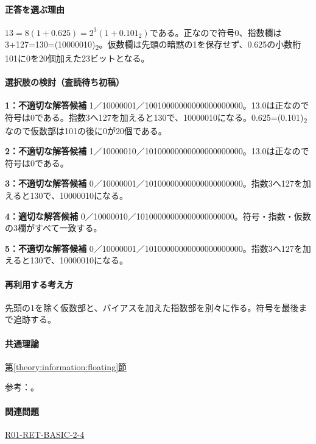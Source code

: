 \paragraph{正答を選ぶ理由} \(13=8(1+0.625)=2^3(1+0.101_2)\)である。正なので符号0、指数欄は3+127=\allowbreak{}130=\allowbreak{}(10000010)\textsubscript{2}。仮数欄は先頭の暗黙の1を保存せず、0.625の小数桁101に0を20個加えた23ビットとなる。

\paragraph{選択肢の検討（査読待ち初稿）}\mbox{}\par

\noindent\textbf{1：不適切な解答候補} 1／10000001／10010000000000000000000。13.0は正なので符号は0である。指数3へ127を加えると130で、10000010になる。0.625=\allowbreak{}(0.101)\textsubscript{2}なので仮数部は101の後に0が20個である。\par

\noindent\textbf{2：不適切な解答候補} 1／10000010／10100000000000000000000。13.0は正なので符号は0である。\par

\noindent\textbf{3：不適切な解答候補} 0／10000001／10100000000000000000000。指数3へ127を加えると130で、10000010になる。\par

\noindent\textbf{4：適切な解答候補} 0／10000010／10100000000000000000000。符号・指数・仮数の3欄がすべて一致する。\par

\noindent\textbf{5：不適切な解答候補} 0／10000001／10100000000000000000000。指数3へ127を加えると130で、10000010になる。\par

\paragraph{再利用する考え方} 先頭の1を除く仮数部と、バイアスを加えた指数部を別々に作る。符号を最後まで追跡する。

\paragraph{共通理論} \hyperref[theory:information:floating]{第\ref*{theory:information:floating}節}

\par 参考：\cite{oracle_single}。

\paragraph{関連問題} \hyperref[q:r01-ret-basic-2-4]{R01-RET-BASIC-2-4}

